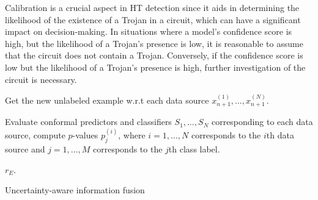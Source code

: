 Calibration is a crucial aspect in HT detection since it aids in determining the likelihood of the existence of a Trojan in a circuit, which can have a significant impact on decision-making. In situations where a model's confidence score is high, but the likelihood of a Trojan's presence is low, it is reasonable to assume that the circuit does not contain a Trojan. Conversely, if the confidence score is low but the likelihood of a Trojan's presence is high, further investigation of the circuit is necessary.

\begin{algorithm}[!b]
\small
{}


Get the new unlabeled example w.r.t each data source $x^{(1)}_{n+1}, \ldots, x^{(N)}_{n+1}$.

Evaluate conformal predictors and classifiers $S_1, \ldots, S_N$ corresponding to each data source, compute $p$-values $p^{(i)}_j$, where $i = 1, \ldots, N$ corresponds to the $i$th data source and $j = 1, \ldots, M$ corresponds to the $j$th class label.


\Return $r_E$.
\caption{Uncertainty-aware information fusion}
\label{algo:mcp}
\end{algorithm}

